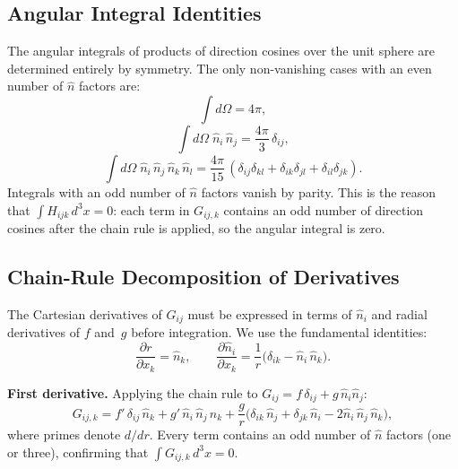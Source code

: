\subsection{Angular Integral Identities}

The angular integrals of products of direction cosines over the unit sphere
are determined entirely by symmetry.  The only non-vanishing cases with an
even number of $\hat{n}$ factors are:
\begin{equation}
  \int d\Omega = 4\pi,
\label{eq:ang0}
\end{equation}
\begin{equation}
  \int d\Omega\;\hat{n}_i\,\hat{n}_j = \frac{4\pi}{3}\,\delta_{ij},
\label{eq:ang2}
\end{equation}
\begin{equation}
  \int d\Omega\;\hat{n}_i\,\hat{n}_j\,\hat{n}_k\,\hat{n}_l
  = \frac{4\pi}{15}\,(\delta_{ij}\delta_{kl}
    + \delta_{ik}\delta_{jl} + \delta_{il}\delta_{jk}).
\label{eq:ang4}
\end{equation}
Integrals with an odd number of $\hat{n}$ factors vanish by parity.  This is
the reason that $\int H_{ijk}\,d^3x = 0$: each term in $G_{ij,k}$ contains
an odd number of direction cosines after the chain rule is applied, so the
angular integral is zero.

\subsection{Chain-Rule Decomposition of Derivatives}

The Cartesian derivatives of $G_{ij}$ must be expressed in terms of
$\hat{n}_i$ and radial derivatives of $f$ and~$g$ before integration.  We
use the fundamental identities:
\begin{equation}
  \frac{\partial r}{\partial x_k} = \hat{n}_k, \qquad
  \frac{\partial\hat{n}_i}{\partial x_k}
  = \frac{1}{r}\bigl(\delta_{ik} - \hat{n}_i\,\hat{n}_k\bigr).
\label{eq:chain}
\end{equation}

\textbf{First derivative.}  Applying the chain rule to
$G_{ij} = f\,\delta_{ij} + g\,\hat{n}_i\hat{n}_j$:
\begin{equation}
  G_{ij,k} = f'\,\delta_{ij}\,\hat{n}_k
  + g'\,\hat{n}_i\,\hat{n}_j\,\hat{n}_k
  + \frac{g}{r}\bigl(\delta_{ik}\,\hat{n}_j
    + \delta_{jk}\,\hat{n}_i - 2\hat{n}_i\,\hat{n}_j\,\hat{n}_k\bigr),
\label{eq:Gijk}
\end{equation}
where primes denote $d/dr$.  Every term contains an odd number of
$\hat{n}$ factors (one or three), confirming that
$\int G_{ij,k}\,d^3x = 0$.

